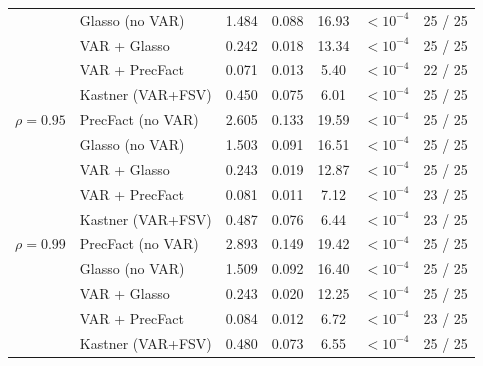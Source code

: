 \begin{table}[h!]
\begin{tabular}{llccccc}
              & Glasso (no VAR)    & 1.484 & 0.088 & 16.93 & $<10^{-4}$ & 25 / 25 \\
              & VAR + Glasso       & 0.242 & 0.018 & 13.34 & $<10^{-4}$ & 25 / 25 \\
              & VAR + PrecFact     & 0.071 & 0.013 &  5.40 & $<10^{-4}$ & 22 / 25 \\
              & Kastner (VAR+FSV)  & 0.450 & 0.075 &  6.01 & $<10^{-4}$ & 25 / 25 \\
\midrule
$\rho = 0.95$ & PrecFact (no VAR)  & 2.605 & 0.133 & 19.59 & $<10^{-4}$ & 25 / 25 \\
              & Glasso (no VAR)    & 1.503 & 0.091 & 16.51 & $<10^{-4}$ & 25 / 25 \\
              & VAR + Glasso       & 0.243 & 0.019 & 12.87 & $<10^{-4}$ & 25 / 25 \\
              & VAR + PrecFact     & 0.081 & 0.011 &  7.12 & $<10^{-4}$ & 23 / 25 \\
              & Kastner (VAR+FSV)  & 0.487 & 0.076 &  6.44 & $<10^{-4}$ & 23 / 25 \\
\midrule
$\rho = 0.99$ & PrecFact (no VAR)  & 2.893 & 0.149 & 19.42 & $<10^{-4}$ & 25 / 25 \\
              & Glasso (no VAR)    & 1.509 & 0.092 & 16.40 & $<10^{-4}$ & 25 / 25 \\
              & VAR + Glasso       & 0.243 & 0.020 & 12.25 & $<10^{-4}$ & 25 / 25 \\
              & VAR + PrecFact     & 0.084 & 0.012 &  6.72 & $<10^{-4}$ & 23 / 25 \\
              & Kastner (VAR+FSV)  & 0.480 & 0.073 &  6.55 & $<10^{-4}$ & 25 / 25 \\
\bottomrule
\end{tabular}
\end{table}

